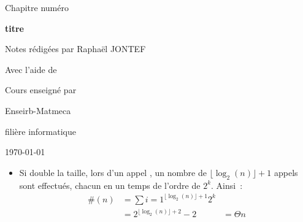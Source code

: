 

\newcommand{\titrechapitre}{titre}
\newcommand{\numerochapitre}{numéro}

\renewcommand{\headrulewidth}{0.4pt}
\renewcommand{\footrulewidth}{0.4pt}
\fancyfoot[C]{\thepage}
\fancyhead[R]{\titrechapitre}




\setlength{\headheight}{15pt}
\begin{titlepage}
    \centering
    \vspace*{3cm}
    {\huge Chapitre \numerochapitre\par}
    {\Huge \bfseries\titrechapitre\par}
    \vspace{2cm}
    {\Large Notes rédigées par Raphaël JONTEF\par}
{\Large Avec l'aide de \par}
    \vspace{0.5cm}
    {\normalsize Cours enseigné par \par}
    \vspace{4cm}
    {\small Enseirb-Matmeca\par}
    {\small filière informatique\par}
    \vfill
    {\large \today\par}
\end{titlepage}

\tableofcontents
\newpage



\begin{itemize}
    \item Si  double la taille, lors d'un appel , un nombre de $\lfloor\log_2(n)\rfloor +1$ appels sont effectués, chacun en un temps de l'ordre de $2^k$. Ainsi~:
    \begin{align*}
        \#(n) &= \sum{i=1}^{\lfloor\log_2(n)\rfloor +1} 2^k\\
        &= 2^{\lfloor\log_2(n)\rfloor + 2} - 2
        &= \Theta n
    \end{align*}
\end{itemize}

